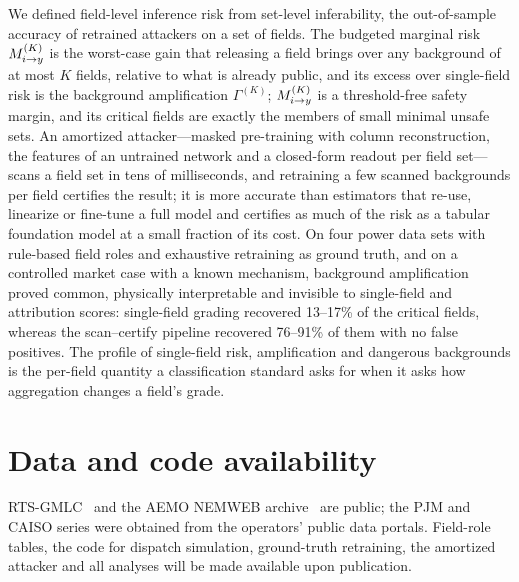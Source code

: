 We defined field-level inference risk from set-level inferability, the out-of-sample accuracy of
retrained attackers on a set of fields. The budgeted marginal risk $M^{(K)}_{i \to y}$ is the worst-case gain
that releasing a field brings over any background of at most $K$ fields, relative to what is
already public, and its excess over single-field risk is the background amplification $\Gamma^{(K)}$;
$M^{(K)}_{i \to y}$ is a threshold-free safety margin, and its critical fields are exactly the
members of small minimal unsafe sets. An amortized attacker---masked pre-training with column
reconstruction, the features of an untrained network and a closed-form readout per field set---scans a field set in
tens of milliseconds, and retraining a few scanned backgrounds per field certifies the result; it is more accurate than
estimators that re-use, linearize or fine-tune a full model and certifies as much of the risk as a tabular foundation
model at a small fraction of its cost. On four power data sets with rule-based field
roles and exhaustive retraining as ground truth, and on a controlled market case with a known
mechanism, background amplification proved common, physically interpretable and invisible to
single-field and attribution scores: single-field grading recovered 13--17\% of the critical fields,
whereas the scan--certify pipeline recovered 76--91\% of them with no false positives. The profile of
single-field risk, amplification and dangerous backgrounds is the per-field quantity a
classification standard asks for when it asks how aggregation changes a field's grade.

\section*{Data and code availability}
RTS-GMLC~\cite{barrows2020rts} and the AEMO NEMWEB archive~\cite{aemo2024nemweb} are public; the PJM and CAISO series
were obtained from the operators' public data portals. Field-role tables, the code for dispatch simulation, ground-truth
retraining, the amortized attacker and all analyses will be made available upon publication.
